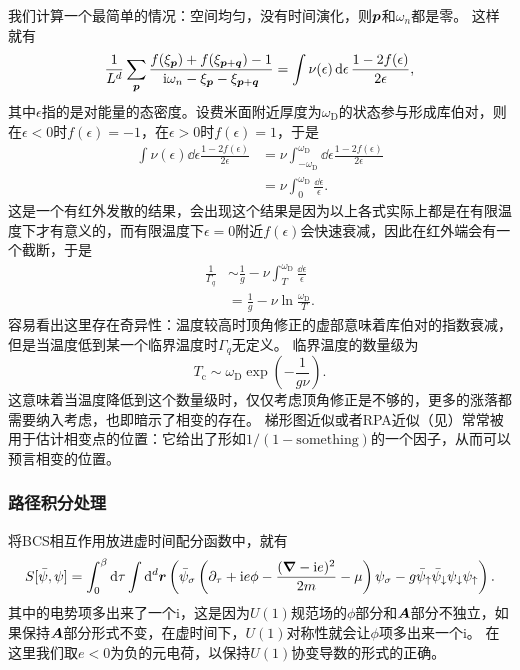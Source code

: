 \documentclass[hyperref, UTF8, a4paper]{ctexart}
\newcommand*{\ii}{\mathrm{i}}
\renewcommand{\autoref}{\prettyref}
\begin{document}
我们计算一个最简单的情况：空间均匀，没有时间演化，则$\vb*{p}$和$\omega_n$都是零。
这样就有
\[
    \frac{1}{L^d} \sum_{\vb*{p}} \frac{f(\xi_{\vb*{p}}) + f(\xi_{\vb*{p}+\vb*{q}}) - 1}{\ii \omega_n - \xi_{\vb*{p}} - \xi_{\vb*{p}+\vb*{q}}} = \int \nu(\epsilon) \dd{\epsilon} \frac{1 - 2f(\epsilon)}{2\epsilon},
\]
其中$\epsilon$指的是对能量的态密度。设费米面附近厚度为$\omega_\text{D}$的状态参与形成库伯对，则在$\epsilon<0$时$f(\epsilon)=-1$，在$\epsilon>0$时$f(\epsilon)=1$，于是
\[
    \begin{aligned}
        \int \nu(\epsilon) \dd{\epsilon} \frac{1 - 2f(\epsilon)}{2\epsilon} &= \nu \int_{-\omega_\text{D}}^{\omega_\text{D}} \dd{\epsilon} \frac{1 - 2f(\epsilon)}{2\epsilon} \\
        &= \nu \int_0^{\omega_\text{D}} \frac{\dd{\epsilon}}{\epsilon}.
    \end{aligned}
\]
这是一个有红外发散的结果，会出现这个结果是因为以上各式实际上都是在有限温度下才有意义的，而有限温度下$\epsilon=0$附近$f(\epsilon)$会快速衰减，因此在红外端会有一个截断，于是
\[
    \begin{aligned}
        \frac{1}{\Gamma_q} &\sim \frac{1}{g} - \nu \int_{T}^{\omega_\text{D}} \frac{\dd{\epsilon}}{\epsilon} \\
        &= \frac{1}{g} - \nu \ln \frac{\omega_\text{D}}{T}.
    \end{aligned}
\]
容易看出这里存在奇异性：温度较高时顶角修正的虚部意味着库伯对的指数衰减，但是当温度低到某一个临界温度时$\Gamma_q$无定义。
临界温度的数量级为
\begin{equation}
    T_\text{c} \sim \omega_\text{D} \exp(- \frac{1}{g \nu}).
\end{equation}
这意味着当温度降低到这个数量级时，仅仅考虑顶角修正是不够的，更多的涨落都需要纳入考虑，也即暗示了相变的存在。
梯形图近似或者RPA近似（见\autoref{note:rpa-graph}）常常被用于估计相变点的位置：它给出了形如$1/(1-\text{something})$的一个因子，从而可以预言相变的位置。

\subsubsection{路径积分处理}

将BCS相互作用放进虚时间配分函数中，就有
\begin{equation}
    S[\bar{\psi}, \psi] = \int_0^\beta \dd{\tau} \int \dd[d]{\vb*{r}} \left(
        \bar{\psi}_\sigma \left( \partial_\tau + \ii e \phi - \frac{(\grad - \ii e)^2}{2m} - \mu \right) \psi_\sigma - g \bar{\psi}_\uparrow \bar{\psi}_\downarrow \psi_\downarrow \psi_\uparrow
    \right).
\end{equation}
其中的电势项多出来了一个$\ii$，这是因为$U(1)$规范场的$\phi$部分和$\vb*{A}$部分不独立，如果保持$\vb*{A}$部分形式不变，在虚时间下，$U(1)$对称性就会让$\phi$项多出来一个$\ii$。
在这里我们取$e<0$为负的元电荷，以保持$U(1)$协变导数的形式的正确。
\end{document}
